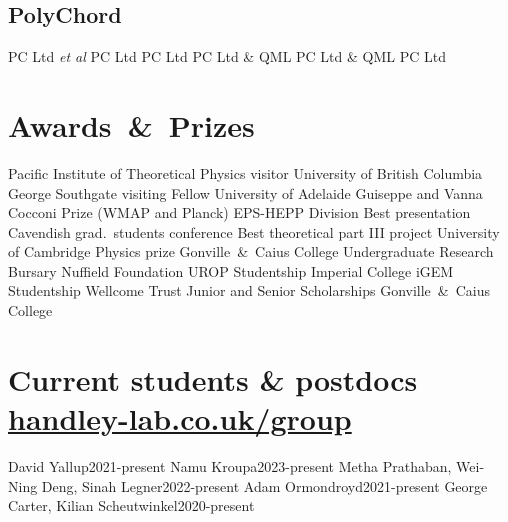 \documentclass[11pt,a4paper,sans]{moderncv}
\begin{document}
\subsection{PolyChord}
 {PC Ltd \textit{et al}}{}{}
 {PC Ltd}{}{}
 {PC Ltd}{}{}
 {PC Ltd \& QML}{}{}
 {PC Ltd \& QML}{}{}
 {}{}{}
 {PC Ltd}{}{}
 {}{}{}
 {}{}{}
 {}{}{}

\section{Awards~\&~Prizes}
  {Pacific Institute of Theoretical Physics visitor}         {University of British Columbia}
  {George Southgate visiting Fellow}         {University of Adelaide}
  {Guiseppe and Vanna Cocconi Prize (WMAP and Planck)}         {EPS-HEPP Division}
  {Best presentation}                 {Cavendish grad.\ students conference}
  {Best theoretical part III project} {University of Cambridge} 
\cvitemwithcomment{}            {Physics prize}                     {Gonville~\&~Caius College} 
 {Undergraduate Research Bursary}    {Nuffield Foundation}  
\cvitemwithcomment{}            {UROP Studentship}                  {Imperial College} 
 {iGEM Studentship}                  {Wellcome Trust} 
    {Junior and Senior Scholarships}    {Gonville~\&~Caius College} 

\pagebreak
\section{Current students \& postdocs \hfill\href{https://www.handley-lab.co.uk/group}{handley-lab.co.uk/group}}
  {David Yallup}{2021-present}
 {Namu Kroupa}{2023-present}
\cvitemwithcomment{} {Metha Prathaban, Wei-Ning Deng, Sinah Legner}{2022-present}
\cvitemwithcomment{}  {Adam Ormondroyd}{2021-present}
\cvitemwithcomment{}  {George Carter, Kilian Scheutwinkel}{2020-present}
\end{document}
